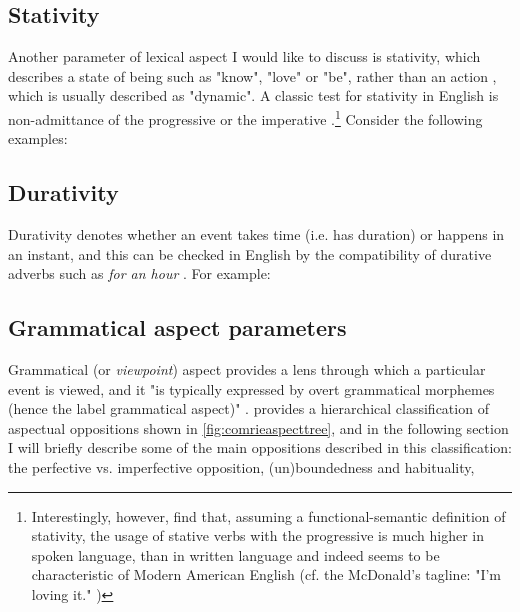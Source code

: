 \subsection*{Stativity}
Another parameter of lexical aspect I would like to discuss is stativity, which describes a state of being such as "know", "love" or "be", rather than an action \citep{binnick1991time}, which is usually described as "dynamic". A classic test for stativity in English is non-admittance of the progressive or the imperative \citep{McINTOSH+1975+35+42}.\footnote{Interestingly, however, \citet{Granath_Wherrity_2013} find that, assuming a functional-semantic definition of stativity, the usage of stative verbs with the progressive is much higher in spoken language, than in written language and indeed seems to be characteristic of Modern American English (cf. the McDonald's tagline: "I'm loving it." \citep{Freund2016RecentCI})} Consider the following examples:
\begin{exe}
\end{exe}
\subsection*{Durativity}
Durativity denotes whether an event takes time (i.e. has duration) or happens in an instant, and this can be checked in English by the compatibility of durative adverbs such as \emph{for an hour} \citep{102998}. For example:
\begin{exe}
\end{exe}

\subsection{Grammatical aspect parameters}
Grammatical (or \emph{viewpoint}) aspect provides a lens through which a particular event is viewed, and it "is typically expressed by overt grammatical morphemes (hence the label grammatical aspect)" \citep{Chapter1IntroductionCrossLinguisticPerspectivesontheSemanticsofGrammaticalAspect}. \citet{comrie1976aspect} provides a hierarchical classification of aspectual oppositions shown in \ref{fig:comrieaspecttree}, and in the following section I will briefly describe some of the main oppositions described in this classification: the perfective vs. imperfective opposition, (un)boundedness and habituality, 

